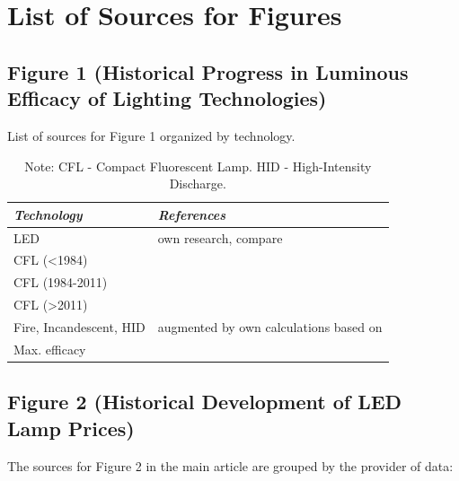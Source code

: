 \documentclass[parskip=full]{article}
\begin{document}
\clearpage
\section{List of Sources for Figures}
\label{sec:sources}

\subsection{Figure 1 (Historical Progress in Luminous Efficacy of Lighting Technologies)}

\begin{table}[h!]
    \caption{List of sources for Figure 1 organized by technology.}
    \begin{NiceTabularX}{\textwidth}{|l|X|}
    \hline
    \textit{Technology} & \textit{References} \\
    \hline
    LED & own research, compare \cite{zenodo_weinold_led_history} \\
    \hline
    CFL (<1984) & \cite{Bouwknegt1982}\cite{Vrenken1983} \\
    \hline
    CFL (1984-2011) & \cite{eger2018origin} \\
    \hline
    CFL (>2011) & \cite{Guan2015} \\
    \hline
    Fire, Incandescent, HID & \cite{azevedo2009transition} augmented by own calculations based on \cite{benesch1905beleuchtungswesen} \\
    \hline
    Max. efficacy & \cite{Murphy2012} \\
    \hline
    \end{NiceTabularX}
    \caption*{Note: CFL - Compact Fluorescent Lamp. HID - High-Intensity Discharge.}
\end{table}

\subsection{Figure 2 (Historical Development of LED Lamp Prices)}

The sources for Figure 2 in the main article are grouped by the provider of data:
\end{document}

